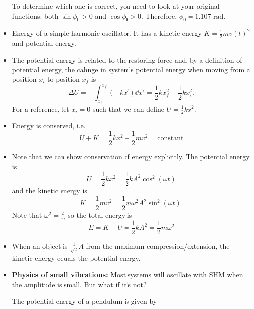 \begin{itemize}
\begin{example}
              To determine which one is correct, you need to look at your original functions: both $\sin\phi_0 > 0$ and $\cos\phi_0 > 0$. Therefore, $\phi_0 = 1.107\text{ rad}$.
          \end{example}
    \item Energy of a simple harmonic oscillator. It has a kinetic energy $K=\frac{1}{2}mv(t)^2$ and potential energy.
    \item The potential energy is related to the restoring force and, by a definition of potential energy, the cahnge in system's potential energy when moving from a position $x_i$ to position $x_f$ is
          \begin{equation}
              \Delta U = - \int_{x_i}^{x_f}(-kx')\dd{x'} = \frac{1}{2}kx_f^2 - \frac{1}{2}kx_i^2.
          \end{equation}
          For a reference, let $x_i=0$ such that we can define $U=\frac{1}{2}kx^2$.
        \item Energy is conserved, i.e.
        \begin{equation}
            U + K = \frac{1}{2}kx^2 + \frac{1}{2}mv^2 = \text{constant}
        \end{equation}
        \item Note that we can show conservation of energy explicitly. The potential energy is
        \begin{equation}
            U = \frac{1}{2}kx^2 = \frac{1}{2}kA^2\cos^2(\omega t)
        \end{equation}
        and the kinetic energy is
        \begin{equation}
            K = \frac{1}{2}mv^2 = \frac{1}{2}m\omega^2A^2\sin^2(\omega t).
        \end{equation}
        Note that $\omega^2 = \frac{k}{m}$ so the total energy is
        \begin{equation}
            E = K + U = \frac{1}{2}kA^2 = \frac{1}{2}m\omega^2
        \end{equation}
        \item When an object is $\frac{1}{\sqrt{2}}A$ from the maximum compression/extension, the kinetic energy equals the potential energy.
        \item \textbf{Physics of small vibrations:} Most systems will oscillate with SHM when the amplitude is small. But what if it's not?
        \begin{example}
            The potential energy of a pendulum is given by
            \begin{equation}

\end{equation}
\end{example}
\end{itemize}
